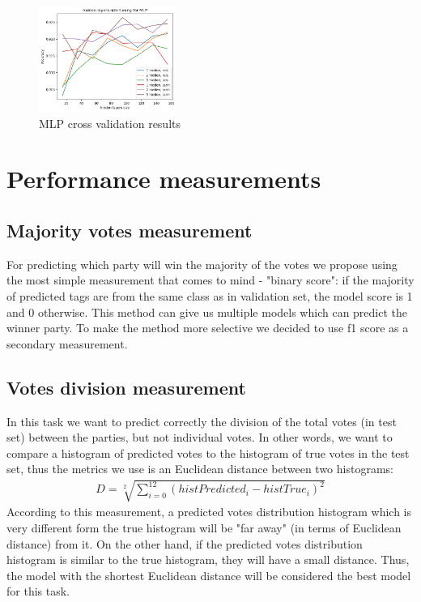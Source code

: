 \documentclass[12pt]{article}
\begin{document}
\begin{figure}[h]
\centering
\includegraphics[width=0.4\textwidth]{Cross_valid_plots/mlp_h_fig}
\caption{MLP cross validation results}
\end{figure}

\newpage
\section{Performance measurements}
\subsection{Majority votes measurement}
For predicting which party will win the majority of the votes we propose using the most simple measurement that comes to mind - "binary score": if the majority of predicted tags are from the same class as in validation set, the model score is 1 and 0 otherwise. This method can give us multiple models which can predict the winner party. To make the method more selective we decided to use f1 score as a secondary measurement.

\subsection{Votes division measurement}
In this task we want to predict correctly the division of the total votes (in test set) between the parties, but not individual votes. In other words, we want to compare a histogram of predicted votes to the histogram of true votes in the test set, thus the metrics we use is an Euclidean distance between two histograms:
\begin{gather*}
D = \sqrt[2]{\sum_{i=0}^{12} (histPredicted_i - histTrue_i)^2}   
\end{gather*}
According to this measurement, a predicted votes distribution histogram which is very different form the true histogram will be "far away" (in terms of Euclidean distance) from it. On the other hand, if the predicted votes distribution histogram is similar to the true histogram, they will have a small distance. Thus, the model with the shortest Euclidean distance will be considered the best model for this task.
\end{document}
